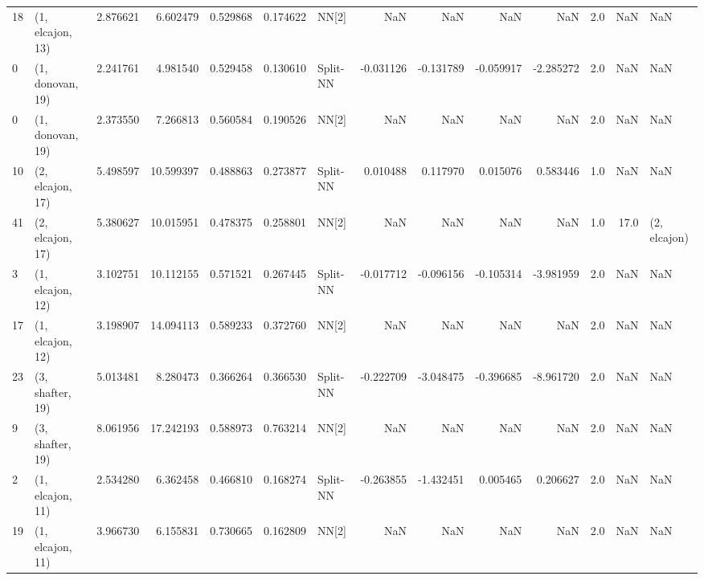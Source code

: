 \begin{tabular}{llrrrrlrrrrrrl}
18 &  (1, elcajon, 13) &  2.876621 &   6.602479 &   0.529868 &  0.174622 &       NN[2] &             NaN &           NaN &            NaN &          NaN &            2.0 &    NaN &              NaN \\
0  &  (1, donovan, 19) &  2.241761 &   4.981540 &   0.529458 &  0.130610 &    Split-NN &       -0.031126 &     -0.131789 &      -0.059917 &    -2.285272 &            2.0 &    NaN &              NaN \\
0  &  (1, donovan, 19) &  2.373550 &   7.266813 &   0.560584 &  0.190526 &       NN[2] &             NaN &           NaN &            NaN &          NaN &            2.0 &    NaN &              NaN \\
10 &  (2, elcajon, 17) &  5.498597 &  10.599397 &   0.488863 &  0.273877 &    Split-NN &        0.010488 &      0.117970 &       0.015076 &     0.583446 &            1.0 &    NaN &              NaN \\
41 &  (2, elcajon, 17) &  5.380627 &  10.015951 &   0.478375 &  0.258801 &       NN[2] &             NaN &           NaN &            NaN &          NaN &            1.0 &   17.0 &     (2, elcajon) \\
3  &  (1, elcajon, 12) &  3.102751 &  10.112155 &   0.571521 &  0.267445 &    Split-NN &       -0.017712 &     -0.096156 &      -0.105314 &    -3.981959 &            2.0 &    NaN &              NaN \\
17 &  (1, elcajon, 12) &  3.198907 &  14.094113 &   0.589233 &  0.372760 &       NN[2] &             NaN &           NaN &            NaN &          NaN &            2.0 &    NaN &              NaN \\
23 &  (3, shafter, 19) &  5.013481 &   8.280473 &   0.366264 &  0.366530 &    Split-NN &       -0.222709 &     -3.048475 &      -0.396685 &    -8.961720 &            2.0 &    NaN &              NaN \\
9  &  (3, shafter, 19) &  8.061956 &  17.242193 &   0.588973 &  0.763214 &       NN[2] &             NaN &           NaN &            NaN &          NaN &            2.0 &    NaN &              NaN \\
2  &  (1, elcajon, 11) &  2.534280 &   6.362458 &   0.466810 &  0.168274 &    Split-NN &       -0.263855 &     -1.432451 &       0.005465 &     0.206627 &            2.0 &    NaN &              NaN \\
19 &  (1, elcajon, 11) &  3.966730 &   6.155831 &   0.730665 &  0.162809 &       NN[2] &             NaN &           NaN &            NaN &          NaN &            2.0 &    NaN &              NaN \\

\end{tabular}
